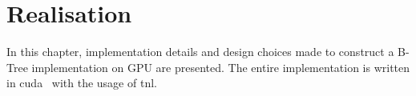\chapter{Realisation}\label{chapter:realisation}

In this chapter, implementation details and design choices made to construct a B-Tree implementation on GPU are presented. The entire implementation is written in \acrshort{cuda} \CC\ with the usage of \acrshort{tnl}.









